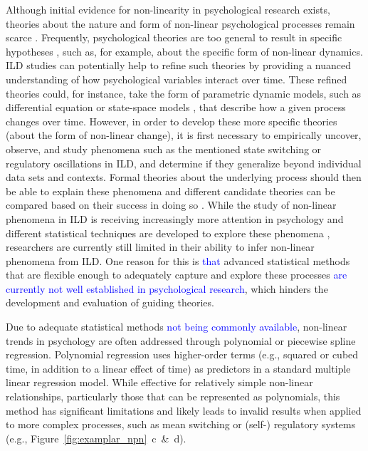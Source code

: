 \documentclass[man, floatsintext]{apa7}
\begin{document}
Although initial evidence for non-linearity in psychological research exists,
theories about the nature and form of non-linear psychological processes remain
scarce \parencite{tan_time-varying_2011}. Frequently, psychological theories
are too general to result in specific hypotheses
\parencite{oberauer_addressing_2019}, such as, for example, about the specific
form of non-linear dynamics. ILD studies can potentially help to refine such
theories by providing a nuanced understanding of how psychological variables
interact over time. These refined theories could, for instance, take the form
of parametric dynamic models, such as differential equation
\parencite{cooper_dynamical_2012} or state-space models
\parencite{durbin_time_2012}, that describe how a given process changes over
time. However, in order to develop these more specific theories (about the form
of non-linear change), it is first necessary to empirically uncover, observe,
and study phenomena such as the mentioned state switching or regulatory
oscillations in ILD, and determine if they generalize beyond individual data
sets and contexts. Formal theories about the underlying process should then be
able to explain these phenomena and different candidate theories can be
compared based on their success in doing so \parencite{borsboom_theory_2021}.
While the study of non-linear phenomena in ILD is receiving increasingly more
attention in psychology and different statistical techniques are developed to
explore these phenomena \parencite{cui_unlocking_2023,humberg_estimating_2024},
researchers are currently still limited in their ability to infer non-linear
phenomena from ILD\@. One reason for this is \textcolor{blue}{that} advanced
statistical methods that are flexible enough to adequately capture and explore
these processes \textcolor{blue}{are currently not well established in
  psychological research}, which hinders the development and evaluation of
guiding theories.

Due to adequate statistical methods \textcolor{blue}{not being commonly
  available}, non-linear trends in
psychology are often addressed through polynomial or piecewise spline
regression. Polynomial regression \parencite{jebb_time_2015} uses higher-order
terms (e.g., squared or cubed time, in addition to a linear effect of time) as
predictors in a standard multiple linear regression model. While effective for
relatively simple non-linear relationships, particularly those that can be
represented as polynomials, this method has significant limitations and likely
leads to invalid results when applied to more complex processes, such as mean
switching or (self-) regulatory systems (e.g.,
Figure~\ref{fig:examplar_npn}~c~\&~d).
\end{document}
